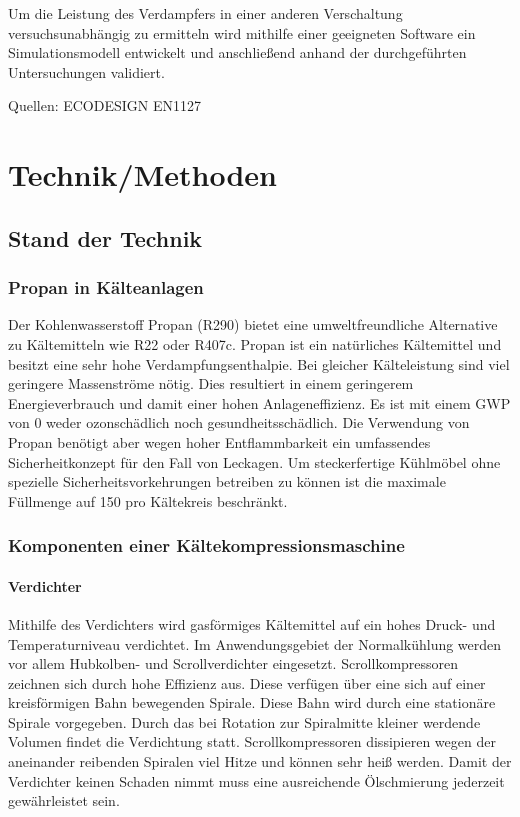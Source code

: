 Um die Leistung des Verdampfers in einer anderen Verschaltung versuchsunabhängig zu ermitteln wird mithilfe einer geeigneten Software ein Simulationsmodell entwickelt und anschließend anhand der durchgeführten Untersuchungen validiert.

Quellen:
ECODESIGN
EN1127


\chapter{Technik/Methoden}
\label{cha:Technik}

\section{Stand der Technik}
\label{sec:Stand der Technik}

\subsection{Propan in Kälteanlagen}
\label{subsec:Propan in Kälteanlagen}

Der Kohlenwasserstoff Propan (R290) bietet eine umweltfreundliche Alternative zu Kältemitteln wie R22 oder R407c. Propan ist ein natürliches Kältemittel und besitzt eine sehr hohe Verdampfungsenthalpie. Bei gleicher Kälteleistung sind viel geringere Massenströme nötig. Dies resultiert in einem geringerem Energieverbrauch und damit einer hohen Anlageneffizienz.
Es ist mit einem GWP von 0 weder ozonschädlich noch gesundheitsschädlich. Die Verwendung von Propan benötigt aber wegen hoher Entflammbarkeit ein umfassendes Sicherheitkonzept für den Fall von Leckagen\cite{BitzerKuhlmaschinenGmbH.2014}\cite{Huber.2011}.
Um steckerfertige Kühlmöbel ohne spezielle Sicherheitsvorkehrungen betreiben zu können ist die maximale Füllmenge auf \unit{150}{\gram} pro Kältekreis beschränkt.



\subsection{Komponenten einer Kältekompressionsmaschine}
\label{subsec:Komponenten einer Kältekompressionsmaschine}

\subsubsection{Verdichter}
\label{subsubsec:Verdichter}

Mithilfe des Verdichters wird gasförmiges Kältemittel auf ein hohes Druck- und Temperaturniveau verdichtet. Im Anwendungsgebiet der Normalkühlung werden vor allem Hubkolben- und Scrollverdichter eingesetzt. Scrollkompressoren zeichnen sich durch hohe Effizienz aus. Diese verfügen über eine sich auf einer kreisförmigen Bahn bewegenden Spirale. Diese Bahn wird durch eine stationäre Spirale vorgegeben. Durch das bei Rotation zur Spiralmitte kleiner werdende Volumen findet die Verdichtung statt. Scrollkompressoren dissipieren wegen der aneinander reibenden Spiralen viel Hitze und können sehr heiß werden. Damit der Verdichter keinen Schaden nimmt muss eine ausreichende Ölschmierung jederzeit gewährleistet sein. 


